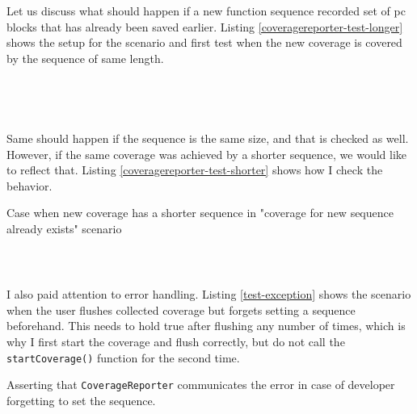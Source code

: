 \documentclass{elteikthesis}[2018/06/06]
\newcommand*{\code}{\lstinline[keywordstyle=\color{violet}, basicstyle=\color{violet}]}
\begin{document}
Let us discuss what should happen if a new function sequence recorded set of pc blocks that has already been saved earlier. Listing \ref{coveragereporter-test-longer} shows the setup for the scenario and first test when the new coverage is covered by the sequence of same length. \\

\begin{listing}
\caption{\label{coveragereporter-test-longer}Setup for scenario "coverage for new sequence already exists" in \code{test/coverageReporter-test.cpp}, and case when new coverage is reached with longer sequence compared to what was recorded earlier}
\inputminted[firstline=86,lastline=104]{c++}{test/coverageReporter-test.cpp} \\
\end{listing}

\begin{center}
\begin{tabular}{}
\\
\\
\end{tabular}
\end{center}

Same should happen if the sequence is the same size, and that is checked as well. However, if the same coverage was achieved by a shorter sequence, we would like to reflect that. Listing \ref{coveragereporter-test-shorter} shows how I check the behavior. \\

\begin{listing}
\caption{\label{coveragereporter-test-shorter}Case when new coverage has a shorter sequence in "coverage for new sequence already exists" scenario}
\inputminted[firstline=117,lastline=127]{c++}{test/coverageReporter-test.cpp} \\
\end{listing}


I also paid attention to error handling. Listing \ref{test-exception} shows the scenario when the user flushes collected coverage but forgets setting a sequence beforehand. This needs to hold true after flushing any number of times, which is why I first start the coverage and flush correctly, but do not call the \code{startCoverage()} function for the second time. \\

\begin{listing}
\caption{\label{test-exception}Asserting that \code{CoverageReporter} communicates the error in case of developer forgetting to set the sequence.}
\inputminted[firstline=129,lastline=139,breaklines]{c++}{test/coverageReporter-test.cpp} \\
\end{listing}
\end{document}
